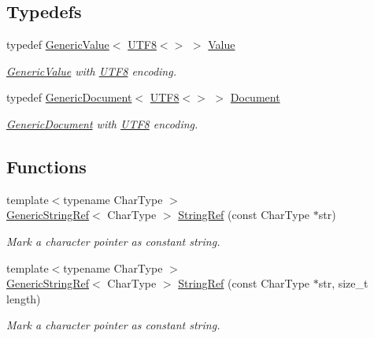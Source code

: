 \subsection*{Typedefs}
\begin{DoxyCompactItemize}
\item 
typedef \hyperlink{a00130}{Generic\+Value}$<$ \hyperlink{a00333}{U\+T\+F8}$<$$>$ $>$ \hyperlink{a00473_a071cf97155ba72ac9a1fc4ad7e63d481}{Value}\hypertarget{a00473_a071cf97155ba72ac9a1fc4ad7e63d481}{}\label{a00473_a071cf97155ba72ac9a1fc4ad7e63d481}

\begin{DoxyCompactList}\small\item\em \hyperlink{a00130}{Generic\+Value} with \hyperlink{a00333}{U\+T\+F8} encoding. \end{DoxyCompactList}\item 
typedef \hyperlink{a00115}{Generic\+Document}$<$ \hyperlink{a00333}{U\+T\+F8}$<$$>$ $>$ \hyperlink{a00473_ac6ea5b168e3fe8c7fa532450fc9391f7}{Document}\hypertarget{a00473_ac6ea5b168e3fe8c7fa532450fc9391f7}{}\label{a00473_ac6ea5b168e3fe8c7fa532450fc9391f7}

\begin{DoxyCompactList}\small\item\em \hyperlink{a00115}{Generic\+Document} with \hyperlink{a00333}{U\+T\+F8} encoding. \end{DoxyCompactList}\end{DoxyCompactItemize}
\subsection*{Functions}
\begin{DoxyCompactItemize}
\item 
{\footnotesize template$<$typename Char\+Type $>$ }\\\hyperlink{a00128}{Generic\+String\+Ref}$<$ Char\+Type $>$ \hyperlink{a00473_aa6b9fd9f6aa49405a574c362ba9af6b5}{String\+Ref} (const Char\+Type $\ast$str)
\begin{DoxyCompactList}\small\item\em Mark a character pointer as constant string. \end{DoxyCompactList}\item 
{\footnotesize template$<$typename Char\+Type $>$ }\\\hyperlink{a00128}{Generic\+String\+Ref}$<$ Char\+Type $>$ \hyperlink{a00473_a578c51ab574a50a9c760b9da7c7562f2}{String\+Ref} (const Char\+Type $\ast$str, size\+\_\+t length)
\begin{DoxyCompactList}\small\item\em Mark a character pointer as constant string. \end{DoxyCompactList}\end{DoxyCompactItemize}


